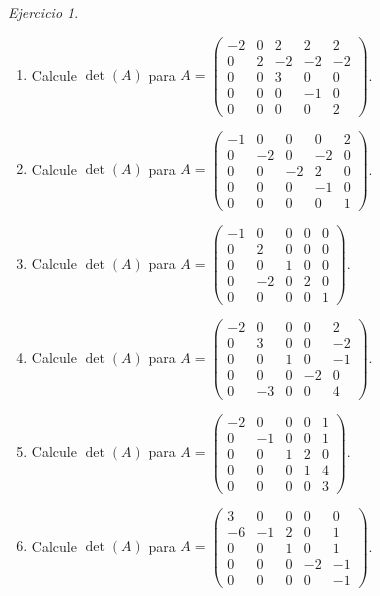 \documentclass[12pt]{article}
\theoremstyle{remark}
\newtheorem{Ejer}[definicion]{Ejercicio}
\begin{document}
\begin{Ejer}
\begin{enumerate}[resume=banco]
\item Calcule $\det(A)$ para $A=\begin{pmatrix}-2&0&2&2&2\\0&2&-2&-2&-2\\0&0&3&0&0\\0&0&0&-1&0\\0&0&0&0&2\end{pmatrix}$.

\item Calcule $\det(A)$ para $A=\begin{pmatrix}-1&0&0&0&2\\0&-2&0&-2&0\\0&0&-2&2&0\\0&0&0&-1&0\\0&0&0&0&1\end{pmatrix}$.

\item Calcule $\det(A)$ para $A=\begin{pmatrix}-1&0&0&0&0\\0&2&0&0&0\\0&0&1&0&0\\0&-2&0&2&0\\0&0&0&0&1\end{pmatrix}$.

\item Calcule $\det(A)$ para $A=\begin{pmatrix}-2&0&0&0&2\\0&3&0&0&-2\\0&0&1&0&-1\\0&0&0&-2&0\\0&-3&0&0&4\end{pmatrix}$.

\item Calcule $\det(A)$ para $A=\begin{pmatrix}-2&0&0&0&1\\0&-1&0&0&1\\0&0&1&2&0\\0&0&0&1&4\\0&0&0&0&3\end{pmatrix}$.

\item Calcule $\det(A)$ para $A=\begin{pmatrix}3&0&0&0&0\\-6&-1&2&0&1\\0&0&1&0&1\\0&0&0&-2&-1\\0&0&0&0&-1\end{pmatrix}$.

\end{enumerate}
\end{Ejer}
\end{document}
